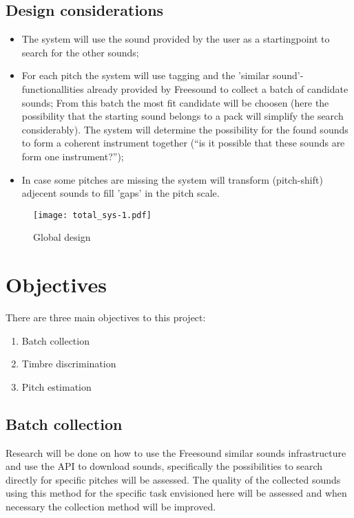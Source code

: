 \documentclass{article}
\begin{document}
\subsection{Design considerations}
    \begin{itemize}
        \item The system will use the sound provided by the user as a startingpoint to search for the other sounds;
        \item For each pitch the system will use tagging and the 'similar sound'-functionallities already provided by Freesound to collect a batch of candidate sounds; From this batch the most fit candidate will be choosen (here the possibility that the starting sound belongs to a pack will simplify the search considerably).  The system will determine the possibility for the found sounds to form a coherent instrument together (“is it possible that these sounds are form one instrument?”);
        \item In case some pitches are missing the system will transform (pitch-shift) adjecent sounds to fill 'gaps' in the pitch scale.
    \end{itemize}

 \begin{figure}
    \texttt{[image: total\_sys-1.pdf]}
    \caption{Global design}
    \label{fig:total}
\end{figure}
   
\section{Objectives}
    There are three main objectives to this project:
    \begin{enumerate}
        \item Batch collection
        \item Timbre discrimination
        \item Pitch estimation
    \end{enumerate}
    \subsection{Batch collection}
        Research will be done on how to use the Freesound similar sounds infrastructure and use the API to download sounds, specifically the possibilities to search directly for specific pitches will be assessed.
        The quality of the collected sounds using this method for the specific task envisioned here will be assessed and when necessary the collection method will be improved.
    
\end{document}
